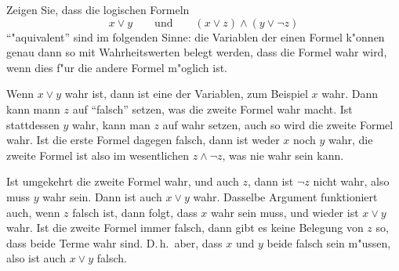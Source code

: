 Zeigen Sie, dass die logischen Formeln
\[
x\vee y\qquad\text{und}\qquad (x\vee z)\wedge (y\vee \neg z)
\]
``"aquivalent'' sind im folgenden Sinne: die Variablen der einen Formel
k"onnen genau dann so mit Wahrheitswerten
belegt werden, dass die Formel wahr wird, wenn dies f"ur die andere Formel
m"oglich ist.

\begin{loesung}
Wenn $x\vee y$ wahr ist, dann ist eine der Variablen, zum Beispiel
$x$ wahr.
Dann kann mann $z$ auf ``falsch'' setzen, was die zweite Formel wahr macht.
Ist stattdessen $y$ wahr, kann man $z$ auf wahr setzen, auch so wird die
zweite Formel wahr.
Ist die erste Formel dagegen falsch, dann ist weder $x$ noch $y$ wahr,
die zweite Formel ist also im wesentlichen $z\wedge \neg z$, was nie
wahr sein kann.

Ist umgekehrt die zweite Formel wahr, und auch $z$, dann ist $\neg z$ nicht 
wahr, also muss $y$ wahr sein. Dann ist auch $x\vee y$ wahr. Dasselbe
Argument funktioniert auch, wenn $z$ falsch ist, dann folgt, dass $x$
wahr sein muss, und wieder ist $x\vee y$ wahr.
Ist die zweite Formel immer falsch, dann gibt es keine Belegung von
$z$ so, dass beide Terme wahr sind.
D.\,h.~aber, dass $x$ und $y$ beide falsch sein m"ussen, also ist auch
$x\vee y$ falsch.


\end{loesung}
